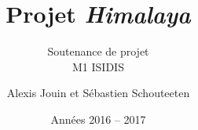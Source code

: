 \documentclass{beamer}
\newcommand{\himalaya}{\emph{Himalaya} }
\begin{document}
	\title{\textbf{Projet \himalaya}}
	\subtitle{Soutenance de projet\\
		{\footnotesize M1 ISIDIS}}
	\author {Alexis Jouin et Sébastien Schouteeten}
	\date{Années 2016 -- 2017}
	\frame[plain]{
		\titlepage
	}
	
	
	

	
	
	
	
	
	
	
	
	
	
	
	
	
	
\end{document}
